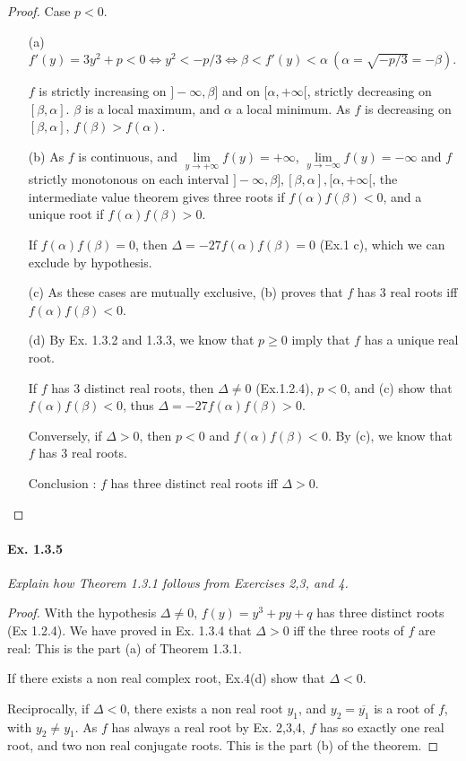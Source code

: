 \documentclass[11pt,a4paper]{article}
\begin{document}
\begin{proof}
Case $p<0$.
\begin{enumerate}

\item[(a)]
$f'(y) = 3y^2+p < 0 \iff y^2<-p/3 \iff \beta < f'(y) < \alpha\  (\alpha = \sqrt{-p/3} = -\beta)$.

$f$ is strictly increasing on $]-\infty,\beta]$ and on $[\alpha, +\infty[$, strictly decreasing on $[\beta,\alpha]$. $\beta$ is a local maximum, and $\alpha$ a local minimum. As $f$ is decreasing on  $[\beta,\alpha]$, $f(\beta) > f(\alpha)$.

\item[(b)] As $f$ is continuous, and  $\lim\limits_{y\to +\infty} f(y) = +\infty$,  $\lim\limits_{y\to -\infty} f(y) = -\infty$ and $f$ strictly  monotonous on each interval $]-\infty,\beta],[\beta,\alpha],[\alpha, +\infty[$, the intermediate value theorem gives three roots if $f(\alpha)f(\beta)<0$, and a unique root if $f(\alpha) f(\beta)>0$.

If  $f(\alpha)f(\beta) = 0$, then  $\Delta = -27 f(\alpha)f(\beta) = 0$ (Ex.1 c), which we can exclude by hypothesis.

\item[(c)] As these cases are mutually exclusive, (b) proves that $f$ has 3 real roots iff $f(\alpha)f(\beta)<0$. 

\item[(d)]
By Ex. 1.3.2 and 1.3.3, we know that $p\geq 0$ imply that $f$ has a unique real root. 

If $f$ has 3 distinct real roots, then $\Delta \neq 0$ (Ex.1.2.4), $p<0$, and (c) show that $f(\alpha)f(\beta) <0$, thus $\Delta = -27 f(\alpha)f(\beta) >0$.

Conversely, if $\Delta>0$, then $p<0$ and $f(\alpha)f(\beta)<0$. By (c), we know that $f$ has 3 real roots.

Conclusion :  $f$ has three distinct real roots iff  $\Delta >0$.

\end{enumerate}

\end{proof}

\paragraph{Ex. 1.3.5}

{\it Explain how Theorem 1.3.1 follows from Exercises 2,3, and 4.
}

\begin{proof}
With the hypothesis $\Delta \neq 0$, $f(y) = y^3+py+q$ has three distinct roots (Ex 1.2.4). We have proved in Ex. 1.3.4 that $\Delta >0$ iff the three roots of $f$ are real: This is the part (a) of Theorem 1.3.1.

If there exists a non real complex root, Ex.4(d) show that $\Delta <0$.

Reciprocally, if $\Delta <0$, there exists a non real root $y_1$, and $y_2 = \overline{y_1}$ is a root of $f$, with $y_2 \ne y_1$. As $f$ has always a real root by Ex. 2,3,4, $f$ has so exactly one real root, and two non real conjugate roots. This is the part (b) of the theorem.
\end{proof}
\end{document}
